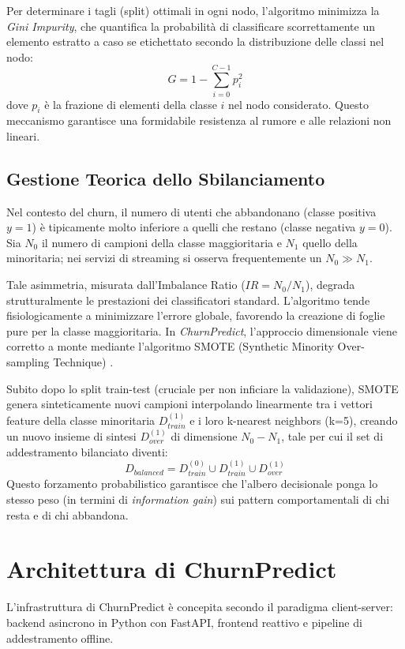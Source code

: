 \documentclass[11pt,a4paper]{article}
\begin{document}
Per determinare i tagli (split) ottimali in ogni nodo, l'algoritmo minimizza la \textit{Gini Impurity}, che quantifica la probabilità di classificare scorrettamente un elemento estratto a caso se etichettato secondo la distribuzione delle classi nel nodo:
\begin{equation}
G = 1 - \sum_{i=0}^{C-1} p_i^2
\end{equation}
dove $p_i$ è la frazione di elementi della classe $i$ nel nodo considerato. Questo meccanismo garantisce una formidabile resistenza al rumore e alle relazioni non lineari.

\subsection{Gestione Teorica dello Sbilanciamento}
Nel contesto del churn, il numero di utenti che abbandonano (classe positiva $y=1$) è tipicamente molto inferiore a quelli che restano (classe negativa $y=0$). Sia $N_0$ il numero di campioni della classe maggioritaria e $N_1$ quello della minoritaria; nei servizi di streaming si osserva frequentemente un $N_0 \gg N_1$.

Tale asimmetria, misurata dall'Imbalance Ratio ($IR = N_0 / N_1$), degrada strutturalmente le prestazioni dei classificatori standard. L'algoritmo tende fisiologicamente a minimizzare l'errore globale, favorendo la creazione di foglie pure per la classe maggioritaria. In \textit{ChurnPredict}, l'approccio dimensionale viene corretto a monte mediante l'algoritmo SMOTE (Synthetic Minority Over-sampling Technique) \cite{chawla2002}. 

Subito dopo lo split train-test (cruciale per non inficiare la validazione), SMOTE genera sinteticamente nuovi campioni interpolando linearmente tra i vettori feature della classe minoritaria $D_{train}^{(1)}$ e i loro k-nearest neighbors (k=5), creando un nuovo insieme di sintesi $D_{over}^{(1)}$ di dimensione $N_0 - N_1$, tale per cui il set di addestramento bilanciato diventi:
\begin{equation}
D_{balanced} = D_{train}^{(0)} \cup D_{train}^{(1)} \cup D_{over}^{(1)}
\end{equation}
Questo forzamento probabilistico garantisce che l'albero decisionale ponga lo stesso peso (in termini di \textit{information gain}) sui pattern comportamentali di chi resta e di chi abbandona.

\section{Architettura di ChurnPredict}
L'infrastruttura di ChurnPredict è concepita secondo il paradigma client-server: backend asincrono in Python con FastAPI, frontend reattivo e pipeline di addestramento offline.
\end{document}
